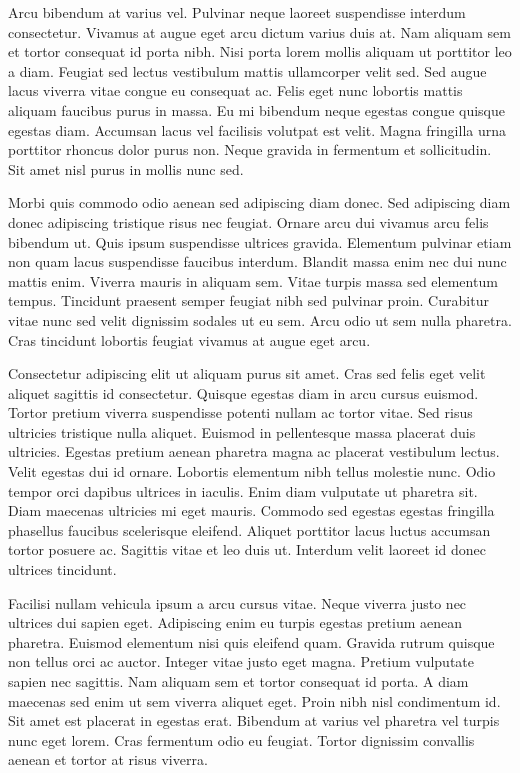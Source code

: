 \documentclass[11pt,a4paper]{article}
\begin{document}
Arcu bibendum at varius vel. Pulvinar neque laoreet suspendisse interdum consectetur. Vivamus at augue eget arcu dictum varius duis at. Nam aliquam sem et tortor consequat id porta nibh. Nisi porta lorem mollis aliquam ut porttitor leo a diam. Feugiat sed lectus vestibulum mattis ullamcorper velit sed. Sed augue lacus viverra vitae congue eu consequat ac. Felis eget nunc lobortis mattis aliquam faucibus purus in massa. Eu mi bibendum neque egestas congue quisque egestas diam. Accumsan lacus vel facilisis volutpat est velit. Magna fringilla urna porttitor rhoncus dolor purus non. Neque gravida in fermentum et sollicitudin. Sit amet nisl purus in mollis nunc sed.

Morbi quis commodo odio aenean sed adipiscing diam donec. Sed adipiscing diam donec adipiscing tristique risus nec feugiat. Ornare arcu dui vivamus arcu felis bibendum ut. Quis ipsum suspendisse ultrices gravida. Elementum pulvinar etiam non quam lacus suspendisse faucibus interdum. Blandit massa enim nec dui nunc mattis enim. Viverra mauris in aliquam sem. Vitae turpis massa sed elementum tempus. Tincidunt praesent semper feugiat nibh sed pulvinar proin. Curabitur vitae nunc sed velit dignissim sodales ut eu sem. Arcu odio ut sem nulla pharetra. Cras tincidunt lobortis feugiat vivamus at augue eget arcu.

Consectetur adipiscing elit ut aliquam purus sit amet. Cras sed felis eget velit aliquet sagittis id consectetur. Quisque egestas diam in arcu cursus euismod. Tortor pretium viverra suspendisse potenti nullam ac tortor vitae. Sed risus ultricies tristique nulla aliquet. Euismod in pellentesque massa placerat duis ultricies. Egestas pretium aenean pharetra magna ac placerat vestibulum lectus. Velit egestas dui id ornare. Lobortis elementum nibh tellus molestie nunc. Odio tempor orci dapibus ultrices in iaculis. Enim diam vulputate ut pharetra sit. Diam maecenas ultricies mi eget mauris. Commodo sed egestas egestas fringilla phasellus faucibus scelerisque eleifend. Aliquet porttitor lacus luctus accumsan tortor posuere ac. Sagittis vitae et leo duis ut. Interdum velit laoreet id donec ultrices tincidunt.

Facilisi nullam vehicula ipsum a arcu cursus vitae. Neque viverra justo nec ultrices dui sapien eget. Adipiscing enim eu turpis egestas pretium aenean pharetra. Euismod elementum nisi quis eleifend quam. Gravida rutrum quisque non tellus orci ac auctor. Integer vitae justo eget magna. Pretium vulputate sapien nec sagittis. Nam aliquam sem et tortor consequat id porta. A diam maecenas sed enim ut sem viverra aliquet eget. Proin nibh nisl condimentum id. Sit amet est placerat in egestas erat. Bibendum at varius vel pharetra vel turpis nunc eget lorem. Cras fermentum odio eu feugiat. Tortor dignissim convallis aenean et tortor at risus viverra.
\end{document}
